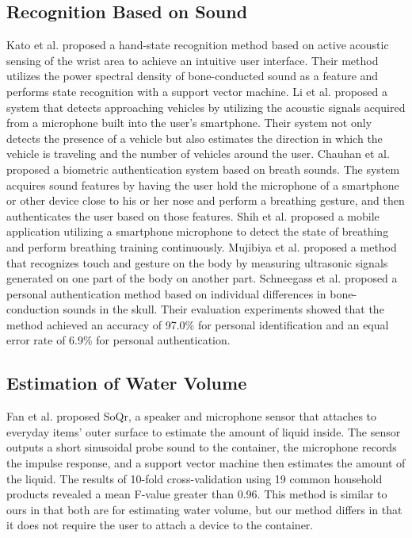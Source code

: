 \documentclass[manuscript,screen,anonymous,review]{acmart}
\begin{document}
\subsection{Recognition Based on Sound}
Kato et al. \cite{sound_sensing1} proposed a hand-state recognition method based on active acoustic sensing of the wrist area to achieve an intuitive user interface. Their method utilizes the power spectral density of bone-conducted sound as a feature and performs state recognition with a support vector machine.
Li et al. \cite{Auto++} proposed a system that detects approaching vehicles by utilizing the acoustic signals acquired from a microphone built into the user's smartphone. Their system not only detects the presence of a vehicle but also estimates the direction in which the vehicle is traveling and the number of vehicles around the user.
Chauhan et al. \cite{BreathPrint} proposed a biometric authentication system based on breath sounds. The system acquires sound features by having the user hold the microphone of a smartphone or other device close to his or her nose and perform a breathing gesture, and then authenticates the user based on those features.
Shih et al. \cite{Breeze} proposed a mobile application utilizing a smartphone microphone to detect the state of breathing and perform breathing training continuously.
Mujibiya et al. \cite{sound_sensing2} proposed a method that recognizes touch and gesture on the body by measuring ultrasonic signals generated on one part of the body on another part.
Schneegass et al. \cite{SkullConduct} proposed a personal authentication method based on individual differences in bone-conduction sounds in the skull. Their evaluation experiments showed that the method achieved an accuracy of 97.0\% for personal identification and an equal error rate of 6.9\% for personal authentication.


\subsection{Estimation of Water Volume}
Fan et al. \cite{SoQr} proposed SoQr, a speaker and microphone sensor that attaches to everyday items' outer surface to estimate the amount of liquid inside. The sensor outputs a short sinusoidal probe sound to the container, the microphone records the impulse response, and a support vector machine then estimates the amount of the liquid. The results of 10-fold cross-validation using 19 common household products revealed a mean F-value greater than 0.96.
This method is similar to ours in that both are for estimating water volume, but our method differs in that it does not require the user to attach a device to the container.
\end{document}
